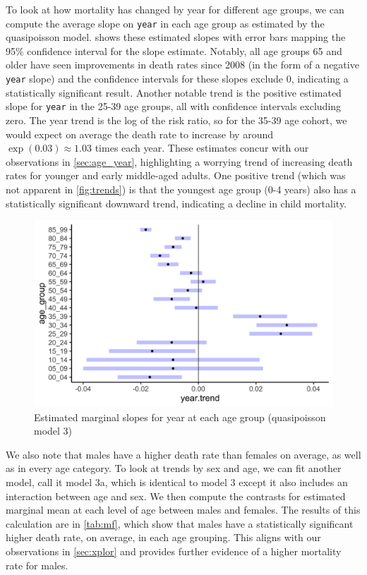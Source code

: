\documentclass[11pt]{article}
\begin{document}
To look at how mortality has changed by year for different age groups, we can compute the average slope on \verb+year+ in each age group as estimated by the quasipoisson model\cite{emmeans}.
 shows these estimated slopes with error bars mapping the 95\% confidence interval for the slope estimate. 
Notably, all age groups 65 and older have seen improvements in death rates since 2008 (in the form of a negative \verb+year+ slope) and the confidence intervals for these slopes exclude 0, indicating a statistically significant result. 
Another notable trend is the positive estimated slope for \verb+year+ in the 25-39 age groups, all with confidence intervals excluding zero.
The year trend is the log of the risk ratio, so for the 35-39 age cohort, we would expect on average the death rate to increase by around $\exp(0.03) \approx 1.03$ times each year.
These estimates concur with our observations in \cref{sec:age_year}, highlighting a worrying trend of increasing death rates for younger and early middle-aged adults.
One positive trend (which was not apparent in \cref{fig:trends}) is that the youngest age group (0-4 years) also has a statistically significant downward trend, indicating a decline in child mortality.

\begin{figure}
\centering
\includegraphics[scale=0.11]{figs/em_plot.png}
\caption{Estimated marginal slopes for year at each age group (quasipoisson model 3)}
\label{fig:em_plot}
\end{figure}

We also note that males have a higher death rate than females on average, as well as in every age category. 
To look at trends by sex and age, we can fit another model, call it model 3a, which is identical to model 3 except it also includes an interaction between age and sex. 
We then compute the contrasts for estimated marginal mean at each level of age between males and females. 
The results of this calculation are in \cref{tab:mf}, which show that males have a statistically significant higher death rate, on average, in each age grouping. 
This aligns with our observations in \cref{sec:xplor} and provides further evidence of a higher mortality rate for males.
\end{document}
